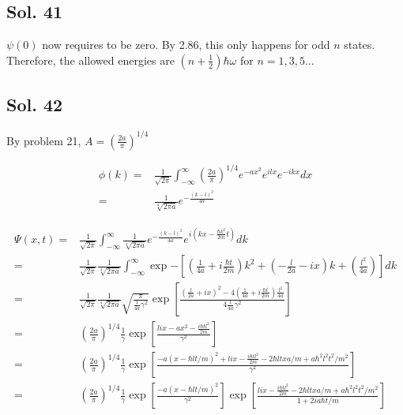     \subsection*{Sol. 41}
    $\psi(0)$ now requires to be zero. By 2.86, this only happens for odd $n$ states. Therefore, the allowed energies are $(n+\frac{1}{2})\hbar\omega$ for $n=1,3,5...$


    \subsection*{Sol. 42}
    By problem 21, $A = (\frac{2a}{\pi})^{1/4}$

    \begin{align*}
        \phi(k) =& 
        \frac{1}{\sqrt{2\pi}}
        \int_{-\infty}^{\infty}
        \left(\frac{2a}{\pi}\right)^{1/4}
        e^{-ax^2}e^{ilx}
        e^{-ikx}dx\\
        =& \frac{1}{\sqrt[4]{2\pi a}}e^{-\frac{(k-l)^2}{4a}}
    \end{align*}

    \begin{align*}
        \Psi(x,t) = &
        \frac{1}{\sqrt{2\pi}}
        \int_{-\infty}
        ^\infty
        \frac{1}{\sqrt[4]{2\pi a}}e^{-\frac{(k-l)^2}{4a}}
        e^{i(kx-\frac{\hbar k^2}{2m}t)}dk\\
        =& 
        \frac{1}{\sqrt{2\pi}}
        \frac{1}{\sqrt[4]{2\pi a}}
        \int_{-\infty}
        ^\infty
        \exp{-\left[
        (\frac{1}{4a}+i\frac{\hbar t}{2m})k^2
        +(-\frac{l}{2a}-ix)k
        + (\frac{l^2}{4a})
        \right]}dk\\
        =& 
        \frac{1}{\sqrt{2\pi}}
        \frac{1}{\sqrt[4]{2\pi a}}
        \sqrt{\frac{\pi}{\frac{1}{4a}\gamma^2}}
        \exp{\left[
        \frac{(\frac{l}{2a}+ix)^2
        -4(\frac{1}{4a}+i\frac{\hbar t}{2m})\frac{l^2}{4a}
        }{4\frac{1}{4a}\gamma^2}
        \right]}\\
        =& 
        \left(
        \frac{2a}{\pi}
        \right)^{1/4}
        \frac{1}{\gamma}
        \exp{\left[
        \frac{lix-ax^2-\frac{i\hbar tl^2}{2m}
        }{\gamma^2}
        \right]}\\
        =& 
        \left(
        \frac{2a}{\pi}
        \right)^{1/4}
        \frac{1}{\gamma}
        \exp{\left[
        \frac{-a(x-\hbar lt/m)^2+lix-\frac{i\hbar tl^2
        }{2m}
        -2\hbar ltxa/m
        +a\hbar^2l^2t^2/m^2
        }{\gamma^2}
        \right]}\\
        =& 
        \left(
        \frac{2a}{\pi}
        \right)^{1/4}
        \frac{1}{\gamma}
        \exp{\left[
        \frac{-a(x-\hbar lt/m)^2
       }{\gamma^2}
        \right]}
        \exp\left[
        \frac{
        lix-\frac{i\hbar tl^2}{2m}
        -2\hbar ltxa/m
        +a\hbar^2l^2t^2/m^2}{1+2ia\hbar t/m}
        \right]
    \end{align*}

